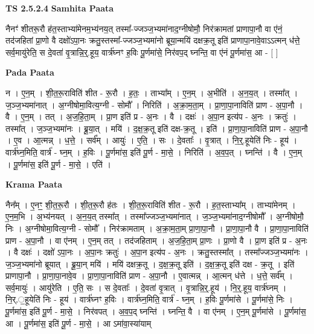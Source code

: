 \documentclass[17pt]{extarticle}
\begin{document}
\textbf{TS 2.5.2.4 } \newline
\textbf{Samhita Paata} \newline

नैनꣳ॑ शीतरू॒रौ ह॑त॒स्ताभ्या॑मेनम॒भ्य॑नय॒त् तस्मा᳚-ज्जञ्ज॒भ्यमा॑नाद॒ग्नीषोमौ॒ निर॑क्रामतां प्राणापा॒नौ वा ए॑नं॒ तद॑जहितां प्रा॒णो वै दक्षो॑ऽपा॒नः क्रतु॒स्तस्मा᳚-ज्जञ्ज॒भ्यमा॑नो ब्रूया॒न्मयि॑ दक्षक्र॒तू इति॑ प्राणापा॒नावे॒वाऽऽत्मन् ध॑त्ते॒ सर्व॒मायु॑रेति॒ स दे॒वता॑ वृ॒त्रान्नि॒र्॒.हूय॒ वार्त्र॑घ्नꣳ ह॒विः पू॒र्णमा॑से॒ निर॑वप॒द् घ्नन्ति॒ वा ए॑नं पू॒र्णमा॑स॒ आ - [  ] \newline

\textbf{Pada Paata} \newline

न । ए॒न॒म् । शी॒त॒रू॒राविति॑ शीत - रू॒रौ । ह॒तः॒ । ताभ्या᳚म् । ए॒न॒म् । अ॒भीति॑ । अ॒न॒य॒त् । तस्मा᳚त् । ज॒ञ्ज॒भ्यमा॑नात् । अ॒ग्नीषोमा॒वित्य॒ग्नी - सोमौ᳚ । निरिति॑ । अ॒क्रा॒म॒ता॒म् । प्रा॒णा॒पा॒नाविति॑ प्राण - अ॒पा॒नौ । वै । ए॒न॒म् । तत् । अ॒ज॒हि॒ता॒म् । प्रा॒ण इति॑ प्र - अ॒नः । वै । दक्षः॑ । अ॒पा॒न इत्य॑प - अ॒नः । क्रतुः॑ । तस्मा᳚त् । ज॒ञ्ज॒भ्यमा॑नः । ब्रू॒या॒त् । मयि॑ । द॒क्ष॒क्र॒तू इति॑ दक्ष-क्र॒तू । इति॑ । प्रा॒णा॒पा॒नाविति॑ प्राण - अ॒पा॒नौ । ए॒व । आ॒त्मन्न् । ध॒त्ते॒ । सर्व᳚म् । आयुः॑ । ए॒ति॒ । सः । दे॒वताः᳚ । वृ॒त्रात् । नि॒र्॒.हूयेति॑ निः - हूय॑ । वार्त्र॑घ्न॒मिति॒ वार्त्र॑ - घ्न॒म् । ह॒विः । पू॒र्णमा॑स॒ इति॑ पू॒र्ण - मा॒से॒ । निरिति॑ । अ॒व॒प॒त् । घ्नन्ति॑ । वै । ए॒न॒म् । पू॒र्णमा॑स॒ इति॑ पू॒र्ण - मा॒से॒ । एति॑ ।  \newline


\textbf{Krama Paata} \newline

नैन᳚म् । ए॒नꣳ॒॒ शी॒त॒रू॒रौ । शी॒त॒रू॒रौ ह॑तः । शी॒त॒रू॒राविति॑ शीत - रू॒रौ । ह॒त॒स्ताभ्या᳚म् । ताभ्या॑मेनम् । ए॒न॒म॒भि । अ॒भ्य॑नयत् । अ॒न॒य॒त् तस्मा᳚त् । तस्मा᳚ज्जञ्ज॒भ्यमा॑नात् । ज॒ञ्ज॒भ्यमा॑नाद॒ग्नीषोमौ᳚ । अ॒ग्नीषोमौ॒ निः । अ॒ग्नीषोमा॒वित्य॒ग्नी - सोमौ᳚ । निर॑क्रामताम् । अ॒क्रा॒म॒ता॒म् प्रा॒णा॒पा॒नौ । प्रा॒णा॒पा॒नौ वै । प्रा॒णा॒पा॒नाविति॑ प्राण - अ॒पा॒नौ । वा ए॑नम् । ए॒न॒म् तत् । तद॑जहिताम् । अ॒ज॒हि॒ता॒म् प्रा॒णः । प्रा॒णो वै । प्रा॒ण इति॑ प्र - अ॒नः । वै दक्षः॑ । दक्षो॑ ऽपा॒नः । अ॒पा॒नः क्रतुः॑ । अ॒पा॒न इत्य॑प - अ॒नः । क्रतु॒स्तस्मा᳚त् । तस्मा᳚ज्जञ्ज॒भ्यमा॑नः । ज॒ञ्ज॒भ्यमा॑नो ब्रूयात् । ब्रू॒या॒न् मयि॑ । मयि॑ दक्षक्र॒तू । द॒क्ष॒क्र॒तू इति॑ । द॒क्ष॒क्र॒तू इति॑ दक्ष - क्र॒तू । इति॑ प्राणापा॒नौ । प्रा॒णा॒पा॒नावे॒व । प्रा॒णा॒पा॒नाविति॑ प्राण - अ॒पा॒नौ । ए॒वात्मन्न् । आ॒त्मन् ध॑त्ते । ध॒त्ते॒ सर्व᳚म् । सर्व॒मायुः॑ । आयु॑रेति । ए॒ति॒ सः । स दे॒वताः᳚ । दे॒वता॑ वृ॒त्रात् । वृ॒त्रान्नि॒र्॒.हूय॑ । नि॒र्॒.हूय॒ वार्त्र॑घ्नम् । नि॒र्.॒हूयेति॑ निः - हूय॑ । वार्त्र॑घ्नꣳ ह॒विः । वार्त्र॑घ्न॒मिति॒ वार्त्र॑ - घ्न॒म् । ह॒विः पू॒र्णमा॑से । पू॒र्णमा॑से॒ निः । पू॒र्णमा॑स॒ इति॑ पू॒र्ण - मा॒से॒ । निर॑वपत् । अ॒व॒प॒द् घ्नन्ति॑ । घ्नन्ति॒ वै । वा ए॑नम् । ए॒न॒म् पू॒र्णमा॑से । पू॒र्णमा॑स॒ आ । पू॒र्णमा॑स॒ इति॑ पू॒र्ण - मा॒से॒ । आ ऽमा॑वा॒स्या॑याम् \newline
\end{document}
